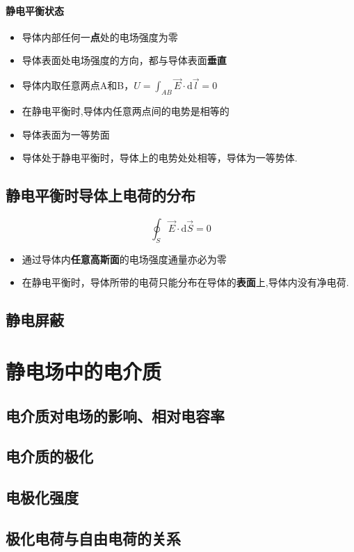 \documentclass[UTF8,a4paper,12pt,scheme=chinese]{ctexbook}
\newcommand{\sll}[1]{\overrightarrow{#1}}
\newcommand{\ud}{\mathrm{d}}
\begin{document}
	\paragraph{静电平衡状态}
	\begin{itemize}
		\item 导体内部任何一\textbf{点}处的电场强度为零
		\item 导体表面处电场强度的方向，都与导体表面\textbf{垂直}
		\item 导体内取任意两点A和B，$ U=\int_{AB}\sll{E}\cdot\ud\sll{l}=0 $
		\item 在静电平衡时,导体内任意两点间的电势是相等的
		\item 导体表面为一等势面
		\item 导体处于静电平衡时，导体上的电势处处相等，导体为一等势体.
	\end{itemize}
	\subsection{静电平衡时导体上电荷的分布}
	$$ \oint_S\sll{E}\cdot\ud \sll{S}=0 $$
	\begin{itemize}
		\item 通过导体内\textbf{任意高斯面}的电场强度通量亦必为零
		\item 在静电平衡时，导体所带的电荷只能分布在导体的\textbf{表面}上,导体内没有净电荷.
	\end{itemize}
	
	\subsection{静电屏蔽}
	\section{静电场中的电介质}
	\subsection{电介质对电场的影响、相对电容率}
	\subsection{电介质的极化}
	\subsection{电极化强度}
	\subsection{极化电荷与自由电荷的关系}
\end{document}
